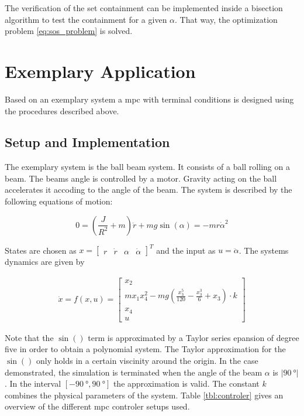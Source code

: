 \documentclass[10pt,a4paper]{article}
\begin{document}
The verification of the set containment can be implemented inside a bisection algorithm to test the containment for a given $\alpha$. That way, the optimization problem \eqref{eq:sos_problem}
is solved.









\section{Exemplary Application}
\label{sec:example}

Based on an exemplary system a \gls{mpc} with terminal conditions is designed using the procedures described above. 


\subsection{Setup and Implementation}
The exemplary system is the ball beam system.
It consists of a ball rolling on a beam. The beams angle is controlled by a motor. Gravity acting on the ball accelerates it accoding to the angle of the beam.
The system is described by the following equations of motion:

\begin{equation}
    0 = \left(\frac{J}{R^2} + m\right)\ddot{r} + mg\sin(\alpha) = - mr\dot{\alpha}^2
\end{equation}

States are chosen as $x = \begin{bmatrix} r & \dot{r} & \alpha & \dot{\alpha} \end{bmatrix}^T$ and the input as $u = \ddot{\alpha}$. The systems dynamics are given by

\begin{align}
    \dot{x} = f(x,u) = \begin{bmatrix}
        x_2 \\
        m x_1 x_4^2 - m g \left(\frac{x_3^5}{120} - \frac{x_3^3}{6} + x_3\right) \cdot k \\
        x_4 \\
        u
    \end{bmatrix}
\end{align}

Note that the $\sin()$ term is approximated by a Taylor series epansion of degree five in order to obtain a polynomial system.
The Taylor approximation for the $\sin()$ only holds in a certain viscinity around the origin. In the case demonstrated, the simulation is terminated when
the angle of the beam $\alpha$ is $|\SI{90}{\degree}|$. In the interval $[-\SI{90}{\degree}, \SI{90}{\degree}]$ the approximation is valid.
The constant $k$ combines the physical parameters of the system. Table \ref{tbl:controler} gives an overview of the different \gls{mpc} controler setups used.
\end{document}
